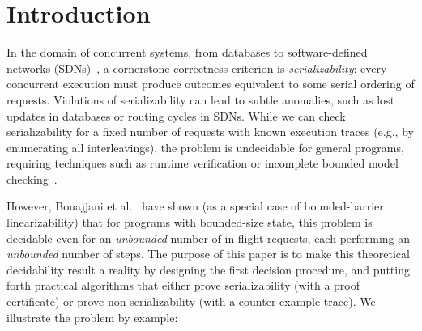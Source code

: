 \section{Introduction}
\label{sec:introduction}

In the domain of concurrent systems, from databases to software-defined networks (SDNs)~\cite{KrRaVePaRoAzUh14,XiWeFoNiXi15}, a cornerstone correctness criterion is \emph{serializability}: every concurrent execution must produce outcomes equivalent to some serial ordering of requests. Violations of serializability can lead to subtle anomalies, such as lost updates in databases or routing cycles in SDNs.
While we can check serializability for a fixed number of requests with known execution traces (e.g., by enumerating all interleavings), the problem is undecidable for general programs, requiring techniques such as runtime verification or incomplete bounded model checking~\cite{WaSt06a,WaSt06b,FlFrYi08,FaMa08,SiMaWaGu11a,SiMaWaGu11b,Pa79,AlMcPe96,BiEn19}.

However, Bouajjani et al.~\cite{BoEmEnHa13} have shown (as a special case of bounded-barrier linearizability) that for programs with bounded-size state, this problem is decidable even for an \emph{unbounded} number of in-flight requests, each performing an \emph{unbounded} number of steps. The purpose of this paper is to make this theoretical decidability result a reality by designing the first decision procedure, and putting forth practical algorithms that either prove serializability (with a proof certificate) or prove non-serializability (with a counter-example trace).
% 
We illustrate the problem by example:


